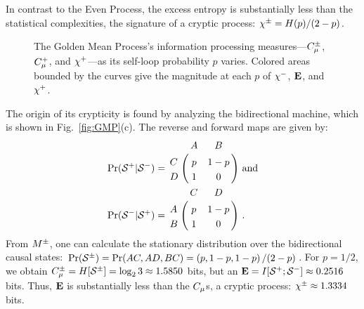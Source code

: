 In contrast to the Even Process, the excess entropy is substantially less than
the statistical complexities, the signature of a cryptic process:
$\chi^{\pm} = H(p)/(2-p)$.

\begin{figure}[th]
\centering
{}
\caption{The Golden Mean Process's information processing
  measures---$C_\mu^{\pm}$, $C_\mu^{+}$, and $\chi^{+}$---as its self-loop
  probability $p$ varies. Colored areas bounded by the curves give the
  magnitude at each $p$ of $\chi^{-}$, ${\bf E}$, and $\chi^{+}$.
  }
\label{fig:GMP_info}
\end{figure}

The origin of its crypticity is found by analyzing the bidirectional machine,
which is shown in Fig.~\ref{fig:GMP}(c). The reverse and forward maps are
given by:
\begin{align*}
\Pr(\FutureCausalState|\PastCausalState) &=
  \bordermatrix{%
      & A   & B \cr
    C & p & 1-p \cr
    D & 1   & 0
  }
  \mathrm{~and}\\
\Pr(\PastCausalState|\FutureCausalState) &=
  \bordermatrix{%
      & C   & D \cr
    A & p & 1-p \cr
    B & 1 & 0
  } ~.
\end{align*}
From ${M}^{\pm}$, one can calculate the stationary distribution over the
bidirectional causal states:
$\Pr({\mathcal{S}}^{\pm}) = \Pr(AC,AD,BC) = \left(p,1-p,1-p\right)/(2-p)$. For
$p=1/2$, we obtain $C_\mu^{\pm} = H[{\mathcal{S}}^{\pm}] = \log_2 3 \approx 1.5850$
bits, but an ${\bf E} = I[{\mathcal{S}}^{+};{\mathcal{S}}^{-}] \approx 0.2516$
bits. Thus, ${\bf E}$ is substantially less than the $C_\mu$s, a cryptic process:
$\chi^{\pm} \approx 1.3334$ bits.

